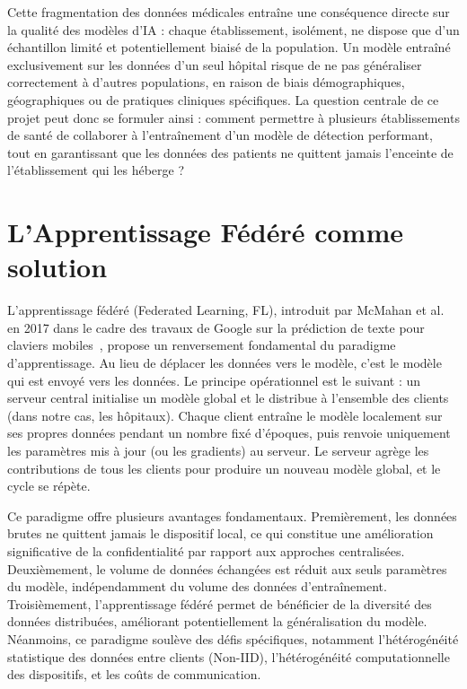 \documentclass[12pt,a4paper]{report}
\begin{document}
Cette fragmentation des donn\'{e}es m\'{e}dicales entra\^{i}ne une cons\'{e}quence directe sur la qualit\'{e} des mod\`{e}les d'IA : chaque \'{e}tablissement, isol\'{e}ment, ne dispose que d'un \'{e}chantillon limit\'{e} et potentiellement biais\'{e} de la population. Un mod\`{e}le entra\^{i}n\'{e} exclusivement sur les donn\'{e}es d'un seul h\^{o}pital risque de ne pas g\'{e}n\'{e}raliser correctement \`{a} d'autres populations, en raison de biais d\'{e}mographiques, g\'{e}ographiques ou de pratiques cliniques sp\'{e}cifiques. La question centrale de ce projet peut donc se formuler ainsi : comment permettre \`{a} plusieurs \'{e}tablissements de sant\'{e} de collaborer \`{a} l'entra\^{i}nement d'un mod\`{e}le de d\'{e}tection performant, tout en garantissant que les donn\'{e}es des patients ne quittent jamais l'enceinte de l'\'{e}tablissement qui les h\'{e}berge ?

\section{L'Apprentissage F\'{e}d\'{e}r\'{e} comme solution}

L'apprentissage f\'{e}d\'{e}r\'{e} (Federated Learning, FL), introduit par McMahan et al. en 2017 dans le cadre des travaux de Google sur la pr\'{e}diction de texte pour claviers mobiles~\cite{mcmahan2017}, propose un renversement fondamental du paradigme d'apprentissage. Au lieu de d\'{e}placer les donn\'{e}es vers le mod\`{e}le, c'est le mod\`{e}le qui est envoy\'{e} vers les donn\'{e}es. Le principe op\'{e}rationnel est le suivant : un serveur central initialise un mod\`{e}le global et le distribue \`{a} l'ensemble des clients (dans notre cas, les h\^{o}pitaux). Chaque client entra\^{i}ne le mod\`{e}le localement sur ses propres donn\'{e}es pendant un nombre fix\'{e} d'\'{e}poques, puis renvoie uniquement les param\`{e}tres mis \`{a} jour (ou les gradients) au serveur. Le serveur agr\`{e}ge les contributions de tous les clients pour produire un nouveau mod\`{e}le global, et le cycle se r\'{e}p\`{e}te.

Ce paradigme offre plusieurs avantages fondamentaux. Premi\`{e}rement, les donn\'{e}es brutes ne quittent jamais le dispositif local, ce qui constitue une am\'{e}lioration significative de la confidentialit\'{e} par rapport aux approches centralis\'{e}es. Deuxi\`{e}mement, le volume de donn\'{e}es \'{e}chang\'{e}es est r\'{e}duit aux seuls param\`{e}tres du mod\`{e}le, ind\'{e}pendamment du volume des donn\'{e}es d'entra\^{i}nement. Troisi\`{e}mement, l'apprentissage f\'{e}d\'{e}r\'{e} permet de b\'{e}n\'{e}ficier de la diversit\'{e} des donn\'{e}es distribu\'{e}es, am\'{e}liorant potentiellement la g\'{e}n\'{e}ralisation du mod\`{e}le. N\'{e}anmoins, ce paradigme soul\`{e}ve des d\'{e}fis sp\'{e}cifiques, notamment l'h\'{e}t\'{e}rog\'{e}n\'{e}it\'{e} statistique des donn\'{e}es entre clients (Non-IID), l'h\'{e}t\'{e}rog\'{e}n\'{e}it\'{e} computationnelle des dispositifs, et les co\^{u}ts de communication.
\end{document}
